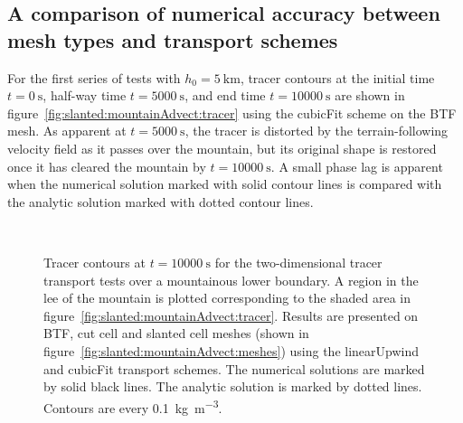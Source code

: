 \subsection{A comparison of numerical accuracy between mesh types and transport schemes}
For the first series of tests with $h_0 = \SI{5}{\kilo\meter}$, tracer contours at the initial time $t=\SI{0}{\second}$, half-way time $t=\SI{5000}{\second}$, and end time $t=\SI{10000}{\second}$ are shown in figure~\ref{fig:slanted:mountainAdvect:tracer} using the cubicFit scheme on the BTF mesh.  As apparent at $t=\SI{5000}{\second}$, the tracer is distorted by the terrain-following velocity field as it passes over the mountain, but its original shape is restored once it has cleared the mountain by $t=\SI{10000}{\second}$.
A small phase lag is apparent when the numerical solution marked with solid contour lines is compared with the analytic solution marked with dotted contour lines.

\begin{figure}
	\centering
	\begin{subfigure}{0.3\textwidth}
		\TODO{}
		\label{fig:slanted:mountainAdvect:errors:linearUpwind-btf}
	\end{subfigure}
	\begin{subfigure}{0.3\textwidth}
		\TODO{}
		\label{fig:slanted:mountainAdvect:errors:linearUpwind-cutCell}
	\end{subfigure}
	\begin{subfigure}{0.3\textwidth}
		\TODO{}
		\label{fig:slanted:mountainAdvect:errors:linearUpwind-slantedCell}
	\end{subfigure} \\
	\begin{subfigure}{0.3\textwidth}
		\TODO{}
		\label{fig:slanted:mountainAdvect:errors:cubicFit-btf}
	\end{subfigure}
	\begin{subfigure}{0.3\textwidth}
		\TODO{}
		\label{fig:slanted:mountainAdvect:errors:cubicFit-cutCell}
	\end{subfigure}
	\begin{subfigure}{0.3\textwidth}
		\TODO{}
		\label{fig:slanted:mountainAdvect:errors:cubicFit-slantedCell}
	\end{subfigure}

	\caption{Tracer contours at $t=\SI{10000}{\second}$ for the two-dimensional tracer transport tests over a mountainous lower boundary.  A region in the lee of the mountain is plotted corresponding to the shaded area in figure~\ref{fig:slanted:mountainAdvect:tracer}.
	Results are presented on BTF, cut cell and slanted cell meshes (shown in figure~\ref{fig:slanted:mountainAdvect:meshes}) using the linearUpwind and cubicFit transport schemes.  The numerical solutions are marked by solid black lines.  The analytic solution is marked by dotted lines.  Contours are every \SI{0.1}{\kilo\gram\per\meter\cubed}.}
	\label{fig:slanted:mountainAdvect:errors}
\end{figure}

